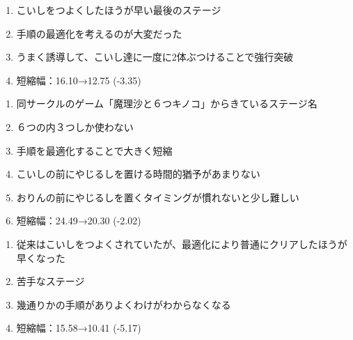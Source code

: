 \begin{enumerate}[label={\sarrow}]
\item こいしをつよくしたほうが早い最後のステージ
\item 手順の最適化を考えるのが大変だった
\item うまく誘導して、こいし達に一度に2体ぶつけることで強行突破
\item 短縮幅：16.10→12.75 (-3.35)
\end{enumerate}



\begin{enumerate}[label={\sarrow}]
\item 同サークルのゲーム「魔理沙と６つキノコ」からきているステージ名
\item ６つの内３つしか使わない
\item 手順を最適化することで大きく短縮
\item こいしの前にやじるしを置ける時間的猶予があまりない
\item おりんの前にやじるしを置くタイミングが慣れないと少し難しい
\item 短縮幅：24.49→20.30 (-2.02)
\end{enumerate}



\clearpage
\begin{enumerate}[label={\sarrow}]
\item 従来はこいしをつよくされていたが、最適化により普通にクリアしたほうが早くなった
\item 苦手なステージ
\item 幾通りかの手順がありよくわけがわからなくなる
\item 短縮幅：15.58→10.41 (-5.17)
\end{enumerate}



